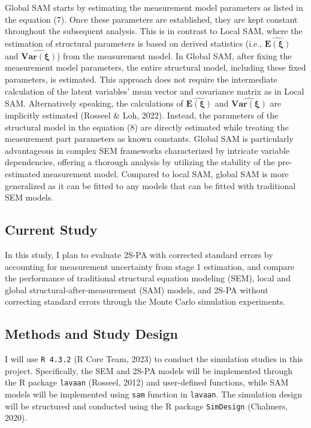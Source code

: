 \documentclass[
  man]{apa7}
\begin{document}
Global SAM starts by estimating the measurement model parameters as listed in the equation (7). Once these parameters are established, they are kept constant throughout the subsequent analysis. This is in contrast to Local SAM, where the estimation of structural parameters is based on derived statistics (i.e., \(\boldsymbol{\widehat{E(\boldsymbol{\xi})}}\) and \(\boldsymbol{\widehat{Var(\boldsymbol{\xi})}}\)) from the measurement model. In Global SAM, after fixing the measurement model parameters, the entire structural model, including these fixed parameters, is estimated. This approach does not require the intermediate calculation of the latent variables' mean vector and covariance matrix as in Local SAM. Alternatively speaking, the calculations of \(\boldsymbol{\widehat{E(\boldsymbol{\xi})}}\) and \(\boldsymbol{\widehat{Var(\boldsymbol{\xi})}}\) are implicitly estimated (Rosseel \& Loh, 2022). Instead, the parameters of the structural model in the equation (8) are directly estimated while treating the measurement part parameters as known constants. Global SAM is particularly advantageous in complex SEM frameworks characterized by intricate variable dependencies, offering a thorough analysis by utilizing the stability of the pre-estimated measurement model. Compared to local SAM, global SAM is more generalized as it can be fitted to any models that can be fitted with traditional SEM models.

\hypertarget{current-study}{%
\subsection{Current Study}\label{current-study}}

In this study, I plan to evaluate 2S-PA with corrected standard errors by accounting for measurement uncertainty from stage 1 estimation, and compare the performance of traditional structural equation modeling (SEM), local and global structural-after-measurement (SAM) models, and 2S-PA without correcting standard errors through the Monte Carlo simulation experiments.

\hypertarget{methods-and-study-design}{%
\subsection{Methods and Study Design}\label{methods-and-study-design}}

I will use \texttt{R\ 4.3.2} (R Core Team, 2023) to conduct the simulation studies in this project. Specifically, the SEM and 2S-PA models will be implemented through the R package \texttt{lavaan} (Rosseel, 2012) and user-defined functions, while SAM models will be implemented using \texttt{sam} function in \texttt{lavaan}. The simulation design will be structured and conducted using the R package \texttt{SimDesign} (Chalmers, 2020).
\end{document}
